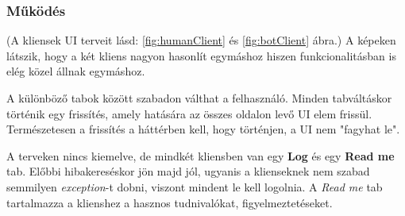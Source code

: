 \documentclass[twoside, a4paper, 12pt]{article}
\begin{document}
\subsubsection{Működés}
(A kliensek UI terveit lásd: \ref{fig:humanClient} és \ref{fig:botClient} ábra.)
A képeken látszik, hogy a két kliens nagyon hasonlít egymáshoz hiszen funkcionalitásban is elég közel állnak egymáshoz.

A különböző tabok között szabadon válthat a felhasználó. Minden tabváltáskor történik egy frissítés, amely hatására az összes oldalon levő UI elem frissül. Természetesen a frissítés a háttérben kell, hogy történjen, a UI nem "fagyhat le".

A terveken nincs kiemelve, de mindkét kliensben van egy \textbf{Log} és egy \textbf{Read me} tab. Előbbi hibakereséskor jön majd jól, ugyanis a klienseknek nem szabad semmilyen \textit{exception}-t dobni, viszont mindent le kell logolnia. A \textit{Read me} tab tartalmazza a klienshez a hasznos tudnivalókat, figyelmeztetéseket.
\end{document}
